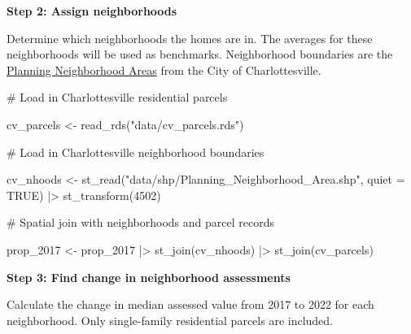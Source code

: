 \documentclass[
  letterpaper,
  DIV=11,
  numbers=noendperiod]{scrartcl}
\newenvironment{Shaded}{\begin{snugshade}}{\end{snugshade}}
\newcommand{\AttributeTok}[1]{\textcolor[rgb]{0.40,0.45,0.13}{#1}}
\newcommand{\CommentTok}[1]{\textcolor[rgb]{0.37,0.37,0.37}{#1}}
\newcommand{\ConstantTok}[1]{\textcolor[rgb]{0.56,0.35,0.01}{#1}}
\newcommand{\DecValTok}[1]{\textcolor[rgb]{0.68,0.00,0.00}{#1}}
\newcommand{\FunctionTok}[1]{\textcolor[rgb]{0.28,0.35,0.67}{#1}}
\newcommand{\NormalTok}[1]{\textcolor[rgb]{0.00,0.23,0.31}{#1}}
\newcommand{\OtherTok}[1]{\textcolor[rgb]{0.00,0.23,0.31}{#1}}
\newcommand{\SpecialCharTok}[1]{\textcolor[rgb]{0.37,0.37,0.37}{#1}}
\newcommand{\StringTok}[1]{\textcolor[rgb]{0.13,0.47,0.30}{#1}}
\begin{document}
\textbf{Step 2: Assign neighborhoods}

Determine which neighborhoods the homes are in. The averages for these
neighborhoods will be used as benchmarks. Neighborhood boundaries are
the
\href{https://opendata.charlottesville.org/datasets/charlottesville::planning-neighborhood-area/about}{Planning
Neighborhood Areas} from the City of Charlottesville.

\begin{Shaded}
\begin{Highlighting}[]
\CommentTok{\# Load in Charlottesville residential parcels}

\NormalTok{cv\_parcels }\OtherTok{\textless{}{-}} \FunctionTok{read\_rds}\NormalTok{(}\StringTok{"data/cv\_parcels.rds"}\NormalTok{)}

\CommentTok{\# Load in Charlottesville neighborhood boundaries}

\NormalTok{cv\_nhoods }\OtherTok{\textless{}{-}} \FunctionTok{st\_read}\NormalTok{(}\StringTok{"data/shp/Planning\_Neighborhood\_Area.shp"}\NormalTok{, }\AttributeTok{quiet =} \ConstantTok{TRUE}\NormalTok{) }\SpecialCharTok{|\textgreater{}} 
    \FunctionTok{st\_transform}\NormalTok{(}\DecValTok{4502}\NormalTok{)}

\CommentTok{\# Spatial join with neighborhoods and parcel records}

\NormalTok{prop\_2017 }\OtherTok{\textless{}{-}}\NormalTok{ prop\_2017 }\SpecialCharTok{|\textgreater{}} 
  \FunctionTok{st\_join}\NormalTok{(cv\_nhoods) }\SpecialCharTok{|\textgreater{}} 
  \FunctionTok{st\_join}\NormalTok{(cv\_parcels)}
\end{Highlighting}
\end{Shaded}

\textbf{Step 3: Find change in neighborhood assessments}

Calculate the change in median assessed value from 2017 to 2022 for each
neighborhood. Only single-family residential parcels are included.
\end{document}
